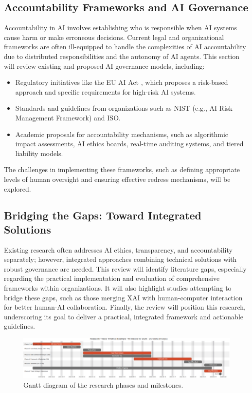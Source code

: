 \documentclass[english]{hogent-article}
\begin{document}
\subsection{Accountability Frameworks and AI Governance}
Accountability in AI involves establishing who is responsible when AI systems cause harm or make erroneous decisions. Current legal and organizational frameworks are often ill-equipped to handle the complexities of AI accountability due to distributed responsibilities and the autonomy of AI agents. This section will review existing and proposed AI governance models, including:
\begin{itemize}
    \item Regulatory initiatives like the EU AI Act \autocite{EuropeanCommission2021AIAct}, which proposes a risk-based approach and specific requirements for high-risk AI systems.
    \item Standards and guidelines from organizations such as NIST (e.g., AI Risk Management Framework) and ISO.
    \item Academic proposals for accountability mechanisms, such as algorithmic impact assessments, AI ethics boards, real-time auditing systems, and tiered liability models.
\end{itemize}
The challenges in implementing these frameworks, such as defining appropriate levels of human oversight and ensuring effective redress mechanisms, will be explored.

\subsection{Bridging the Gaps: Toward Integrated Solutions}
Existing research often addresses AI ethics, transparency, and accountability separately; however, integrated approaches combining technical solutions with robust governance are needed. This review will identify literature gaps, especially regarding the practical implementation and evaluation of comprehensive frameworks within organizations. It will also highlight studies attempting to bridge these gaps, such as those merging XAI with human-computer interaction for better human-AI collaboration. Finally, the review will position this research, underscoring its goal to deliver a practical, integrated framework and actionable guidelines.

\begin{figure}[htbp]
  \centering
  \includegraphics[width=1\textwidth]{paper/img/gantt-chart.png}
  \caption{Gantt diagram of the research phases and milestones.}
  \label{fig:gantt}
\end{figure}
\end{document}
